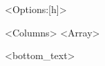 \begin{table}<Options:[h]>
\centering
\caption{<Caption:nameless table>}
\label{<Label>}
\begin{<fontsize>}
\begin{tabular}{<Columns>}
<Array>
\end{tabular}
\vspace{1ex}

{ \centering <bottom_text> \par}
\end{<fontsize>}
\end{table}
